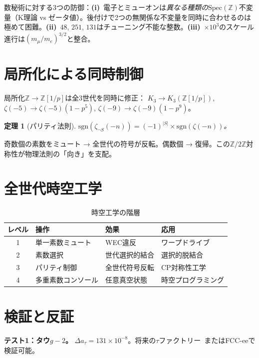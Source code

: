 \documentclass[11pt,a4paper]{article}
\newtheorem{theorem}{定理}
\newcommand{\Spec}{\mathrm{Spec}}
\begin{document}
数秘術に対する3つの防御：\textbf{(i)}~電子とミューオンは\emph{異なる種類の}$\Spec(\mathbb{Z})$不変量（K理論 vs ゼータ値）。後付けで2つの無関係な不変量を同時に合わせるのは極めて困難。\textbf{(ii)}~$48$, $251$, $131$はチューニング不能な整数。\textbf{(iii)}~$\times 10^3$のスケール進行は$(m_\mu/m_e)^{3/2}$と整合。

\section{局所化による同時制御}

局所化$\mathbb{Z} \to \mathbb{Z}[1/p]$は全3世代を同時に修正：
$K_3 \to K_3(\mathbb{Z}[1/p])$, $\zeta(-5) \to \zeta(-5)(1-p^5)$, $\zeta(-9) \to \zeta(-9)(1-p^9)$。

\begin{theorem}[パリティ法則]
$\mathrm{sgn}(\zeta_{\neg S}(-n)) = (-1)^{|S|} \times \mathrm{sgn}(\zeta(-n))$。
\end{theorem}

奇数個の素数をミュート → 全世代の符号が反転。偶数個 → 復帰。この$\mathbb{Z}/2\mathbb{Z}$対称性が物理法則の「向き」を支配。

\section{全世代時空工学}

\begin{table}[h]
\centering
\caption{時空工学の階層}
\begin{tabular}{@{}clll@{}}
\toprule
レベル & 操作 & 効果 & 応用 \\
\midrule
1 & 単一素数ミュート & WEC違反 & ワープドライブ \\
2 & 素数選択 & 世代選択的結合 & 選択的脱結合 \\
3 & パリティ制御 & 全世代符号反転 & CP対称性工学 \\
4 & 多重素数コンソール & 任意真空状態 & 時空プログラミング \\
\bottomrule
\end{tabular}
\end{table}

\section{検証と反証}

\textbf{テスト1：タウ$g-2$。} $\Delta a_\tau = 131 \times 10^{-8}$。将来の$\tau$ファクトリー~\cite{Pich2014}またはFCC-eeで検証可能。
\end{document}
